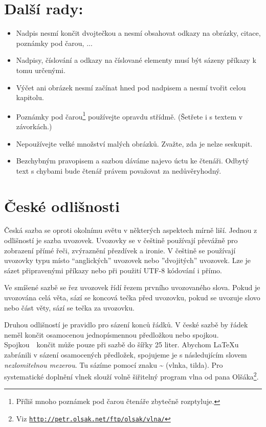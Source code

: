 \documentclass[a4paper,10pt,twocolumn]{article}
\begin{document}
\section{Další rady:}
\begin{itemize}
  \item
  Nadpis nesmí končit dvojtečkou a nesmí obsahovat odkazy na obrázky, citace, poznámky pod čarou, ...
  \item
  Nadpisy, číslování a odkazy na číslované elementy musí být sázeny příkazy k tomu určenými.
  \item
  Výčet ani obrázek nesmí začínat hned pod nadpisem a nesmí tvořit celou kapitolu.
  \item
  Poznámky pod čarou\footnote{Příliš mnoho poznámek pod čarou čtenáře zbytečně rozptyluje.} používejte opravdu střídmě. (Šetřete i s textem v závorkách.)
  \item
  Nepoužívejte velké množství malých obrázků. Zvažte, zda je nelze seskupit.
  \item
  Bezchybným pravopisem a sazbou dáváme najevo úctu ke čtenáři. Odbytý text s chybami bude čtenář právem považovat za nedůvěryhodný.
\end{itemize}

\section{České odlišnosti}

Česká sazba se oproti okolnímu světu v některých aspektech mírně liší. Jednou z odlišností je sazba uvozovek. Uvozovky se v češtině používají převážně pro zobrazení přímé řeči, zvýraznění přezdívek a ironie. V češtině se používají uvozovky typu  místo ``anglických'' uvozovek nebo ''dvojitých'' uvozovek. Lze je sázet připravenými příkazy nebo při použití UTF-8 kódování i přímo.

Ve smíšené sazbě se řez uvozovek řídí řezem prvního uvozovaného slova. Pokud je uvozována celá věta, sází se koncová tečka před uvozovku, pokud se uvozuje slovo nebo část věty, sází se tečka za uvozovku.

Druhou odlišností je pravidlo pro sázení konců řádků. V české sazbě by řádek neměl končit osamocenou jednopísmennou předložkou nebo spojkou. Spojkou~~končit může pouze při sazbě do šířky 25 liter. Abychom  \LaTeX u zabránili v sázení osamocených předložek, spojujeme je s následujícím slovem \emph{nezlomitelnou mezerou}. Tu sázíme pomocí znaku \textbf{\textasciitilde}  (vlnka, tilda). Pro systematické doplnění vlnek slouží volně šiřitelný program vlna od pana Olšáka\footnote{Viz \href{http://petr.olsak.net/ftp/olsak/vlna/}{\texttt{http://petr.olsak.net/ftp/olsak/vlna/}}}.
\end{document}
